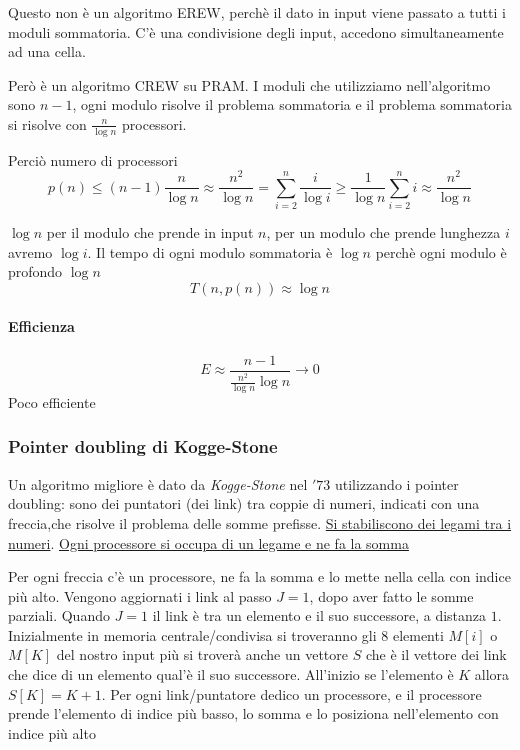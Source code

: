 Questo non è un algoritmo EREW, perchè il dato in input viene passato a tutti i moduli sommatoria. C'è una condivisione degli input, accedono simultaneamente ad una cella.

Però è un algoritmo CREW su PRAM. I moduli che utilizziamo nell'algoritmo sono $n-1$,  ogni modulo risolve il problema sommatoria e il problema sommatoria si risolve con $\frac{n}{\log n}$ processori.

Perciò numero di processori
$$ p(n) \leq (n-1)\frac{n}{\log n} \approx \frac{n^2}{\log n} = \sum_{i=2}^n \frac{i}{\log i} \geq \frac{1}{\log n} \sum_{i=2}^n i \approx \frac{n^2}{\log n}$$

$\log n$ per il modulo che prende in input $n$, per un modulo che prende lunghezza $i$ avremo $\log i$. Il tempo di ogni modulo sommatoria è $\log n$ perchè ogni modulo è profondo $\log n$
$$T(n,p(n)) \approx \log n $$

\paragraph{Efficienza}
$$E \approx \frac{n-1}{\frac{n^2}{\log n} \log n} \rightarrow 0$$
Poco efficiente

\subsubsection{Pointer doubling di Kogge-Stone}
Un algoritmo migliore è dato da \textit{Kogge-Stone} nel $'73$ utilizzando i pointer doubling: sono dei puntatori (dei link) tra coppie di numeri, indicati con una freccia,che risolve il problema delle somme prefisse. \uline{Si stabiliscono dei legami tra i numeri}. \uline{Ogni processore si occupa di un legame e ne fa la somma}

\begin{center}
\end{center}

Per ogni freccia c'è un processore, ne fa la somma e lo mette nella cella con indice più alto. Vengono aggiornati i link al passo $J=1$, dopo aver fatto le somme parziali. Quando $J=1$ il link è tra un elemento e il suo successore, a distanza $1$. Inizialmente in memoria centrale/condivisa si troveranno gli $8$ elementi $M[i]$ o $M[K]$ del nostro input più si troverà anche un vettore $S$ che è il vettore dei link che dice di un elemento qual'è il suo successore. All'inizio se l'elemento è $K$ allora $S[K]=K+1$. Per ogni link/puntatore dedico un processore, e il processore prende l'elemento di indice più basso, lo somma e lo posiziona nell'elemento con indice più alto

